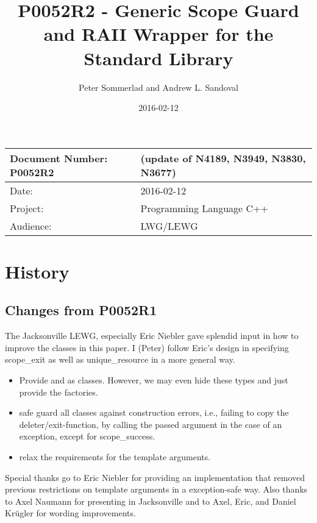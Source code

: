\documentclass[ebook,11pt,article]{memoir}
\title{P0052R2 - Generic Scope Guard and RAII Wrapper for the Standard Library}
\author{Peter Sommerlad and Andrew L. Sandoval}
\date{2016-02-12}                        %
\begin{document}
\maketitle
\begin{tabular}[t]{|l|l|}\hline 
Document Number: P0052R2 &   (update of N4189, N3949, N3830, N3677)\\\hline
Date: & 2016-02-12 \\\hline
Project: & Programming Language C++\\\hline 
Audience: & LWG/LEWG\\\hline
\end{tabular}

\chapter{History}
\section{Changes from P0052R1}
The Jacksonville LEWG, especially Eric Niebler gave splendid input in how to improve the classes in this paper. I (Peter) follow Eric's design in specifying scope_exit as well as unique_resource in a more general way.
\begin{itemize}
\item Provide  and  as classes. However, we may even hide these types and just provide the factories.
\item safe guard all classes against construction errors, i.e., failing to copy the deleter/exit-function, by calling the passed argument in the case of an exception, except for scope_success.
\item relax the requirements for the template arguments.
\end{itemize}
Special thanks go to Eric Niebler for providing an implementation that removed previous restrictions on template arguments in a exception-safe way. Also thanks to Axel Naumann for presenting in Jacksonville and to Axel, Eric, and Daniel Kr\"ugler for wording improvements.
\end{document}

